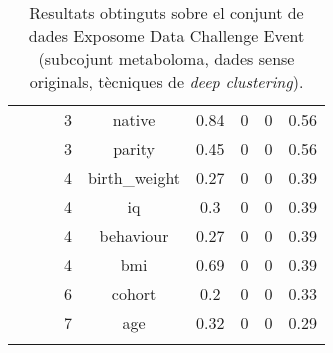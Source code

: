\documentclass[CAT,BIB]{TFUOC}%
\begin{document}
\begin{center}
\begin{longtable}{@{}ccccccccc@{}}
            &  &  & 3 & native & 0.84 & 0 & 0 & 0.56 \\
            &  &  & 3 & parity & 0.45 & 0 & 0 & 0.56 \\
            &  &  & 4 & birth\_weight & 0.27 & 0 & 0 & 0.39 \\
            &  &  & 4 & iq & 0.3 & 0 & 0 & 0.39 \\
            &  &  & 4 & behaviour & 0.27 & 0 & 0 & 0.39 \\
            &  &  & 4 & bmi & 0.69 & 0 & 0 & 0.39 \\
            &  &  & 6 & cohort & 0.2 & 0 & 0 & 0.33 \\
            &  &  & 7 & age & 0.32 & 0 & 0 & 0.29 \\ \bottomrule
        \caption[Exposome Data Challenge Event: resultats - part 2]{
            Resultats obtinguts sobre el conjunt de dades Exposome Data Challenge Event
            (subcojunt metaboloma, dades sense originals, tècniques de \textit{deep clustering}).
        }
        \label{t:results_exposome2}
        \end{longtable}
    \end{center}
    \normalsize
\end{document}
